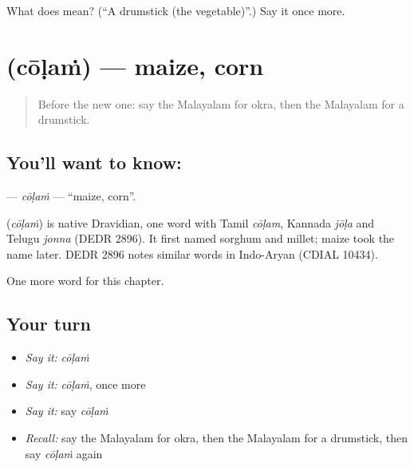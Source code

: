 \begin{tcolorbox}[breakable,colback=teal!4,colframe=teal!35!black,title={Before you move on}]
What does  mean? (\textquotedblleft{}A drumstick (the vegetable)\textquotedblright{}.) Say it once more.
\end{tcolorbox}
\section[\texorpdfstring{\ml{ചോളം} (cōḷaṁ)}{ചോളം (cōḷaṁ)}]{ (cōḷaṁ) — maize, corn}

\label{lesson:ML-C259-colam}



\begin{quote}
Before the new one: say the Malayalam for okra, then the Malayalam for a drumstick.
\end{quote}

\subsection*{You'll want to know: }
\textbf{} — \emph{cōḷaṁ} — \textquotedblleft{}maize, corn\textquotedblright{}.

\begin{cousinweb}
\textbf{} (\emph{cōḷaṁ}) is native Dravidian, one word with Tamil \emph{cōḷam}, Kannada \emph{jōḷa} and Telugu \emph{jonna} (DEDR 2896). It first named sorghum and millet; maize took the name later. DEDR 2896 notes similar words in Indo-Aryan (CDIAL 10434).
\end{cousinweb}

\begin{grammarlens}[title={What you've built}]
One more word for this chapter.
\end{grammarlens}

\subsection*{Your turn}
\begin{itemize}
\raggedright
  \item \emph{Say it:} \emph{cōḷaṁ}
  \item \emph{Say it:} \emph{cōḷaṁ}, once more
  \item \emph{Say it:} say \emph{cōḷaṁ}
  \item \emph{Recall:} say the Malayalam for okra, then the Malayalam for a drumstick, then say \emph{cōḷaṁ} again
\end{itemize}

